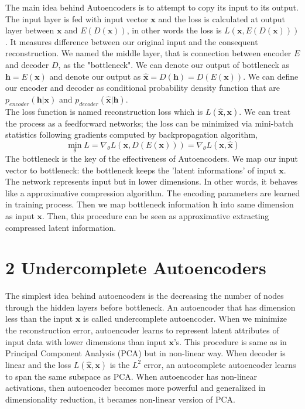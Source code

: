 \documentclass[11pt,twocolumn]{article}
\begin{document}
The main idea behind Autoencoders is to attempt to copy its input to its output. The input layer is fed with input vector $\mathbf{x}$ and the loss is calculated at output layer between $\mathbf{x}$ and $E(D(\mathbf{x}))$, in other words the loss is $L(\mathbf{x},E(D(\mathbf{x})))$. It measures difference between our original input and the consequent reconstruction.  We named the middle layer, that is connection between encoder $E$ and decoder $D$, as the "bottleneck". We can denote our output of bottleneck as $\mathbf{h} = E(\mathbf{x})$ and denote our output as $\mathbf{\hat{x}} = D(\mathbf{h}) = D(E(\mathbf{x}))$. We can define our encoder and decoder as conditional probability density function that are $p_{encoder}(\mathbf{h} | \mathbf{x})$ and $p_{decoder}(\mathbf{\hat{x}} | \mathbf{h})$. \\
The loss function is named reconstruction loss which is $L(\mathbf{\hat{x}},\mathbf{x})$. We can treat the process as a feedforward networks; the loss can be minimized via mini-batch statistics following gradients computed by backpropagation algorithm,
$$\min\limits_{\theta} L = \nabla_\theta L(\mathbf{x}, D(E(\mathbf{x}))) =\nabla_\theta L(\mathbf{x}, \mathbf{\hat{x}}) $$
The bottleneck is the key of the effectiveness of Autoencoders. We map our input vector to bottleneck: the bottleneck keeps the 'latent informations' of input $\mathbf{x}$. The network represents input but in lower dimensions. In other words, it behaves like a approximative compression algorithm. The encoding parameters are learned in training process. Then we map bottleneck information $\mathbf{h}$ into same dimension as input $\mathbf{x}$. Then, this procedure can be seen as approximative extracting compressed latent information.

\section{2 Undercomplete Autoencoders}	
\hspace*{0.5cm} The simplest idea behind autoencoders is the decreasing the number of nodes through the hidden layers before bottleneck. An autoencoder that has dimension less than the input $\mathbf{x}$ is called undercomplete autoencoder. When we minimize the reconstruction error, autoencoder learns to represent latent attributes of input data with lower dimensions than input $\mathbf{x}$'s. This procedure is same as in Principal Component Analysis (PCA) but in non-linear way. When decoder is linear and the loss $L(\mathbf{\hat{x},\mathbf{x}})$ is the $L^2$ error, an autocomplete autoencoder learns to span the same subspace as PCA. When autoencoder has non-linear activations, then autoencoder becomes more powerful and generalized in dimensionality reduction, it becames non-linear version of PCA.
\end{document}
